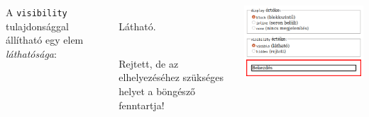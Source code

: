 \begin{frame}
  \begin{columns}[c]
      A \texttt{visibility} tulajdonsággal állítható egy elem \emph{láthatósága}:
      \begin{description}[m]
        \item[\texttt{visible}] \hfill \\ Látható.
        \item[\texttt{hidden}] \hfill \\ Rejtett, de az elhelyezéséhez szükséges helyet a böngésző fenntartja!
      \end{description}
      \begin{exampleblock}{}
        \includegraphics[width=\textwidth]{display.png}
      \end{exampleblock}
  \end{columns}
  
\end{frame}
